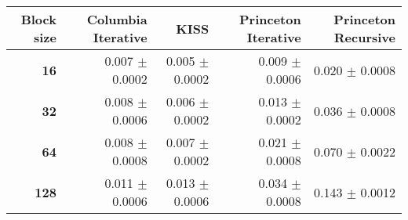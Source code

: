 \begin{tabular}{rrrrr}\toprule
\textbf{Block size}  & \textbf{Columbia Iterative} & \textbf{KISS} & \textbf{Princeton Iterative} & \textbf{Princeton Recursive}\\\midrule
\textbf{16}  & 0.007 $\pm$ 0.0002 & 0.005 $\pm$ 0.0002 & 0.009 $\pm$ 0.0006 & 0.020 $\pm$ 0.0008\\
\textbf{32}  & 0.008 $\pm$ 0.0006 & 0.006 $\pm$ 0.0002 & 0.013 $\pm$ 0.0002 & 0.036 $\pm$ 0.0008\\
\textbf{64}  & 0.008 $\pm$ 0.0008 & 0.007 $\pm$ 0.0002 & 0.021 $\pm$ 0.0008 & 0.070 $\pm$ 0.0022\\
\textbf{128} & 0.011 $\pm$ 0.0006 & 0.013 $\pm$ 0.0006 & 0.034 $\pm$ 0.0008 & 0.143 $\pm$ 0.0012\\
\bottomrule
\end{tabular}
